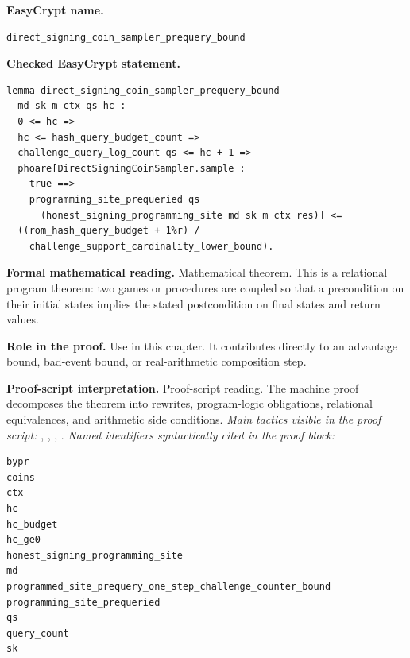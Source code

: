 \begin{formaltheorem}
\noindent\textbf{EasyCrypt name.}
\begin{lstlisting}[language=EasyCrypt,basicstyle=\ttfamily\scriptsize]
direct_signing_coin_sampler_prequery_bound
\end{lstlisting}
\noindent\textbf{Checked EasyCrypt statement.}
\begin{lstlisting}[language=EasyCrypt,basicstyle=\ttfamily\scriptsize]
lemma direct_signing_coin_sampler_prequery_bound
  md sk m ctx qs hc :
  0 <= hc =>
  hc <= hash_query_budget_count =>
  challenge_query_log_count qs <= hc + 1 =>
  phoare[DirectSigningCoinSampler.sample :
    true ==>
    programming_site_prequeried qs
      (honest_signing_programming_site md sk m ctx res)] <=
  ((rom_hash_query_budget + 1%r) /
    challenge_support_cardinality_lower_bound).
\end{lstlisting}
\noindent\textbf{Formal mathematical reading.}
Mathematical theorem. This is a relational program theorem: two games or procedures are coupled so that a precondition on their initial states implies the stated postcondition on final states and return values.

\noindent\textbf{Role in the proof.}
Use in this chapter. It contributes directly to an advantage bound, bad-event bound, or real-arithmetic composition step.

\noindent\textbf{Proof-script interpretation.}
Proof-script reading. The machine proof decomposes the theorem into rewrites, program-logic obligations, relational equivalences, and arithmetic side conditions.
\emph{Main tactics visible in the proof script:} , , , .
\emph{Named identifiers syntactically cited in the proof block:}
\begin{lstlisting}[language=EasyCrypt,basicstyle=\ttfamily\scriptsize]
bypr
coins
ctx
hc
hc_budget
hc_ge0
honest_signing_programming_site
md
programmed_site_prequery_one_step_challenge_counter_bound
programming_site_prequeried
qs
query_count
sk
\end{lstlisting}

\end{formaltheorem}

